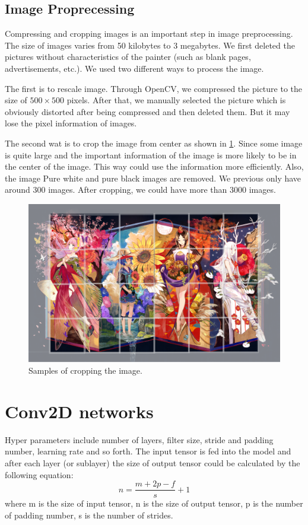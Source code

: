 \documentclass{article}
\begin{document}
\subsection{Image Proprecessing}
Compressing and cropping images is an important step in image preprocessing. 
The size of images varies from 50 kilobytes to 3 megabytes.  We first deleted the pictures without characteristics of the painter (such as blank pages, advertisements, etc.). We used two different ways to process the image.

The first is to rescale image. Through OpenCV, we compressed the picture to the size of $500 \times 500$ pixels. After that, we manually selected the picture which is obviously distorted after being compressed and then deleted them. But it may lose the pixel information of images.

The second wat is to crop the image from center as shown in \ref{crop_sample}. Since some image is quite large and the important information of the image is more likely to be in the center of the image. This way could use the information more efficiently. Also, the image Pure white and pure black images are removed. We previous only have around 300 images. After cropping, we could have more than 3000 images. 

\begin{figure}[ht]
  \centering
  \includegraphics[width=0.5\linewidth]{crop_sample.png}
  \caption{Samples of cropping the image.}
  \label{crop_sample}
\end{figure}




\section{Conv2D networks}

Hyper parameters include number of layers, filter size, stride and padding number, learning rate and so forth. The input tensor is fed into the model and after each layer (or sublayer) the size of output tensor could be calculated by the following equation:
$$n = \frac{m+2p-f}{s} + 1$$
where m is the size of input tensor, n is the size of output tensor, p is the number of padding number, s is the number of strides.
\end{document}

